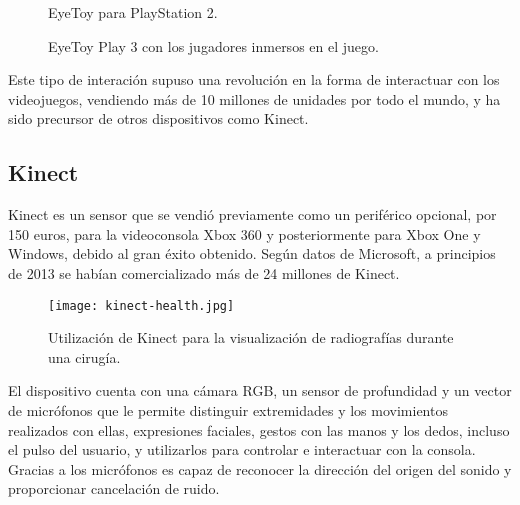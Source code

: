 \begin{figure}[b] %
\hfill
\begin{minipage}[t]{.45\textwidth}
\begin{center}
\caption{EyeToy para PlayStation 2.}
\label{eyeToy}
\end{center}
\end{minipage}
\hfill
\begin{minipage}[t]{.45\textwidth}
\begin{center}
\caption{EyeToy Play 3 con los jugadores inmersos en el juego.}
\label{eyetoy-game}
\end{center}
\end{minipage}
\hfill
\end{figure}

Este tipo de interación supuso una revolución en la forma de interactuar con los videojuegos, vendiendo más de 10 millones de unidades por todo el mundo, y ha sido precursor de otros dispositivos como Kinect.

\subsection{Kinect}
Kinect es un sensor que se vendió previamente como un periférico opcional, por 150 euros, para la videoconsola Xbox 360 y posteriormente para Xbox One y Windows, debido al gran éxito obtenido. Según datos de Microsoft, a principios de 2013 se habían comercializado más de 24 millones de Kinect. 

\begin{figure}
  \centering
  \texttt{[image: kinect-health.jpg]}
  \caption{Utilización de Kinect para la visualización de radiografías durante una cirugía.}
  \label{fig:kinect-health}
\end{figure}



El dispositivo cuenta con una cámara RGB, un sensor de profundidad y un vector de micrófonos que le permite distinguir extremidades y los movimientos realizados con ellas, expresiones faciales, gestos con las manos y los dedos, incluso el pulso del usuario, y utilizarlos para controlar e interactuar con la consola. Gracias a los micrófonos es capaz de reconocer la dirección del origen del sonido y proporcionar cancelación de ruido.

